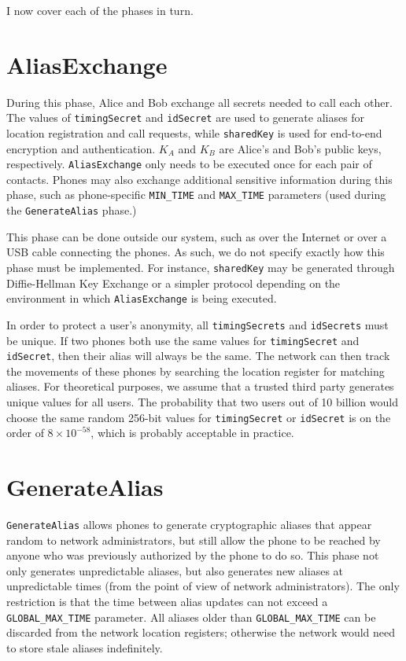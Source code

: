 \documentclass[11pt]{article}
\begin{document}
I now cover each of the phases in turn.

\section{AliasExchange}
During this phase, Alice and Bob exchange all secrets needed to call each other. The values of \texttt{timingSecret} and \texttt{idSecret} are used to generate aliases for location registration and call requests, while \texttt{sharedKey} is used for end-to-end encryption and authentication. \texttt{$K_A$} and \texttt{$K_B$} are Alice's and Bob's public keys, respectively. \texttt{AliasExchange} only needs to be executed once for each pair of contacts. Phones may also exchange additional sensitive information during this phase, such as phone-specific \texttt{MIN_TIME} and \texttt{MAX_TIME} parameters (used during the \texttt{GenerateAlias} phase.)

This phase can be done outside our system, such as over the Internet or over a USB cable connecting the phones. As such, we do not specify exactly how this phase must be implemented. For instance, \texttt{sharedKey} may be generated through Diffie-Hellman Key Exchange or a simpler protocol depending on the environment in which \texttt{AliasExchange} is being executed. 

In order to protect a user's anonymity, all \texttt{timingSecrets} and \texttt{idSecrets} must be unique. If two phones both use the same values for \texttt{timingSecret} and \texttt{idSecret}, then their alias will always be the same. The network can then track the movements of these phones by searching the location register for matching aliases. For theoretical purposes, we assume that a trusted third party generates unique values for all users. The probability that two users out of 10 billion would choose the same random 256-bit values for \texttt{timingSecret} or \texttt{idSecret} is on the order of $8 \times 10^{-58}$, which is probably acceptable in practice.

\section{GenerateAlias}
\texttt{GenerateAlias} allows phones to generate cryptographic aliases that appear random to network administrators, but still allow the phone to be reached by anyone who was previously authorized by the phone to do so. This phase not only generates unpredictable aliases, but also generates new aliases at unpredictable times (from the point of view of network administrators). The only restriction is that the time between alias updates can not exceed a \texttt{GLOBAL_MAX_TIME} parameter. All aliases older than \texttt{GLOBAL_MAX_TIME} can be discarded from the network location registers; otherwise the network would need to store stale aliases indefinitely. 
\end{document}
